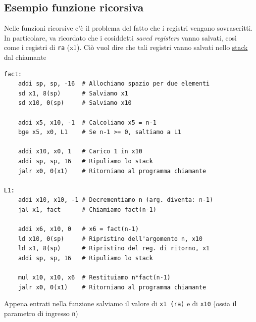 \subsection{Esempio funzione ricorsiva}
Nelle funzioni ricorsive c'è il problema del fatto che i registri vengano sovrascritti. In particolare, va ricordato che i cosiddetti \textit{saved registers} vanno salvati, così come i registri di \verb|ra| (x1). Ciò vuol dire che tali registri vanno salvati nello \underline{stack} dal chiamante
\begin{lstlisting}[language = assembly]
fact:
    addi sp, sp, -16  # Allochiamo spazio per due elementi
    sd x1, 8(sp)      # Salviamo x1
    sd x10, 0(sp)     # Salviamo x10 

    addi x5, x10, -1  # Calcoliamo x5 = n-1
    bge x5, x0, L1    # Se n-1 >= 0, saltiamo a L1 

    addi x10, x0, 1   # Carico 1 in x10
    addi sp, sp, 16   # Ripuliamo lo stack
    jalr x0, 0(x1)    # Ritorniamo al programma chiamante

L1:
    addi x10, x10, -1 # Decrementiamo n (arg. diventa: n-1)
    jal x1, fact      # Chiamiamo fact(n-1)

    addi x6, x10, 0   # x6 = fact(n-1)
    ld x10, 0(sp)     # Ripristino dell'argomento n, x10
    ld x1, 8(sp)      # Ripristino del reg. di ritorno, x1
    addi sp, sp, 16   # Ripuliamo lo stack 

    mul x10, x10, x6  # Restituiamo n*fact(n-1)
    jalr x0, 0(x1)    # Ritorniamo al programma chiamante
\end{lstlisting}
Appena entrati nella funzione salviamo il valore di \verb|x1 (ra)| e di \verb|x10| (ossia il parametro di ingresso \verb|n|)
